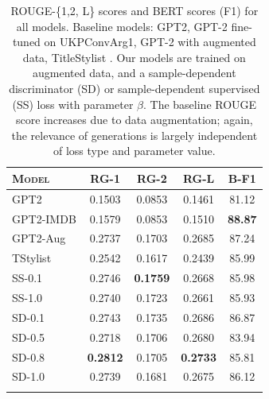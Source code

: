 
\begin{table}[t]
  \centering
  \small
  \caption{ROUGE-\{1,2, L\} scores and BERT scores (F1) for all models. Baseline models: GPT2, GPT-2 fine-tuned on UKPConvArg1, GPT-2 with augmented data, TitleStylist \citep{jin2020hooks}. Our models are trained on augmented data, and a sample-dependent discriminator (SD) or sample-dependent supervised (SS) loss with parameter $\beta$. The baseline ROUGE score increases due to data augmentation; again, the relevance of generations is largely independent of loss type and parameter value.}
  \label{tab:mem-automatic-evaluation}
  \begin{tabularx}{0.9\linewidth}{@{}>{\raggedright\arraybackslash}Xcccc@{}}
   \toprule[1.5pt]
  \textsc{Model} & \textsc{RG-1}            & \textsc{RG-2}           & \textsc{RG-L}    & \textsc{B-F1} \\     
  \midrule[0.75pt]
GPT2      & 0.1503          & 0.0853          & 0.1461          & 81.12          \\
GPT2-IMDB & 0.1579          & 0.0853          & 0.1510          & \textbf{88.87}          \\
GPT2-Aug  & 0.2737          & 0.1703          & 0.2685          & 87.24          \\
TStylist  & 0.2542          & 0.1617          & 0.2439          & 85.99          \\
  \midrule[0.75pt]
  SS-0.1  & 0.2746          & \textbf{0.1759} & 0.2668          & 85.98          \\
  SS-1.0  & 0.2740          & 0.1723          & 0.2661          & 85.93         \\
  SD-0.1  & 0.2743          & 0.1735          & 0.2686          & 86.87          \\
  SD-0.5  & 0.2718          & 0.1706          & 0.2680          & 83.94         \\
  SD-0.8  & \textbf{0.2812} & 0.1705          & \textbf{0.2733}    & 85.81       \\
  SD-1.0  & 0.2739          & 0.1681          & 0.2675          & 86.12         \\
  \bottomrule[1.5pt]\\
  \end{tabularx}
  \vspace{-10pt}
  \end{table}

